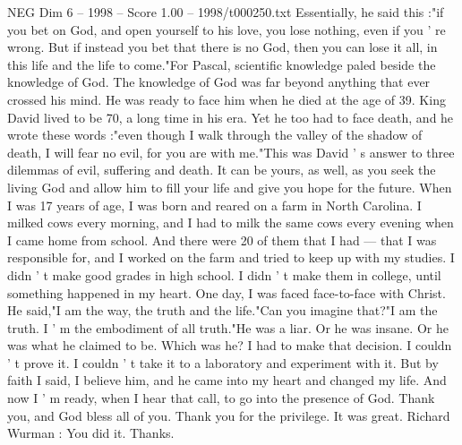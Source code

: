 \begin{textsample}{NEG Dim 6 – 1998 – Score 1.00 – 1998/t000250.txt}
Essentially, he said this :"if you bet on God, and open yourself to his love, you lose nothing, even if you ' re wrong.
But if instead you bet that there is no God, then you can lose it all, in this life and the life to come."For Pascal, scientific knowledge paled beside the knowledge of God.
The knowledge of God was far beyond anything that ever crossed his mind.
He was ready to face him when he died at the age of 39.
King David lived to be 70, a long time in his era.
Yet he too had to face death, and he wrote these words :"even though I walk through the valley of the shadow of death, I will fear no evil, for you are with me."This was David ' s answer to three dilemmas of evil, suffering and death.
It can be yours, as well, as you seek the living God and allow him to fill your life and give you hope for the future.
When I was 17 years of age, I was born and reared on a farm in North Carolina.
I milked cows every morning, and I had to milk the same cows every evening when I came home from school.
And there were 20 of them that I had — that I was responsible for, and I worked on the farm and tried to keep up with my studies.
I didn ' t make good grades in high school.
I didn ' t make them in college, until something happened in my heart.
One day, I was faced face-to-face with Christ.
He said,"I am the way, the truth and the life."Can you imagine that?"I am the truth.
I ' m the embodiment of all truth."He was a liar.
Or he was insane.
Or he was what he claimed to be.
Which was he?
I had to make that decision.
I couldn ' t prove it.
I couldn ' t take it to a laboratory and experiment with it.
But by faith I said, I believe him, and he came into my heart and changed my life.
And now I ' m ready, when I hear that call, to go into the presence of God.
Thank you, and God bless all of you.
Thank you for the privilege.
It was great.
Richard Wurman : You did it.
Thanks.

\end{textsample}
